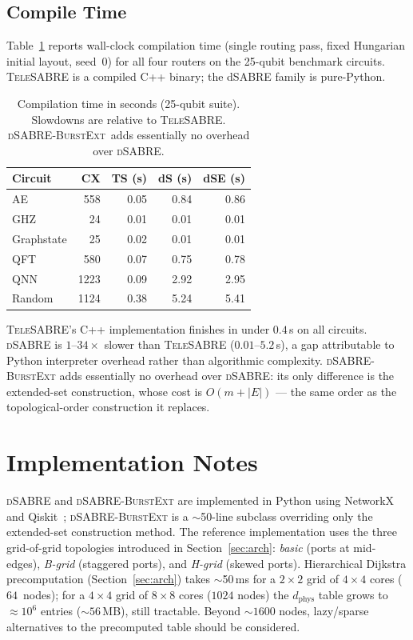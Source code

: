 \documentclass[conference]{IEEEtran}
\newcommand{\dSABRE}{\textsc{dSABRE}}
\newcommand{\BurstExt}{\textsc{dSABRE-BurstExt}}
\newcommand{\TeleSABRE}{\textsc{TeleSABRE}}
\newcommand{\dphys}{d_{\mathrm{phys}}}
\begin{document}
\subsection{Compile Time}
\label{sec:timing}

Table~\ref{tab:timing} reports wall-clock compilation time (single routing
pass, fixed Hungarian initial layout, seed~0) for all four routers on the
25-qubit benchmark circuits.
\TeleSABRE{} is a compiled C++ binary; the dSABRE family is pure-Python.

\begin{table}[t]
\centering
\caption{Compilation time in seconds (25-qubit suite).
  Slowdowns are relative to \TeleSABRE{}.
  \BurstExt\ adds essentially no overhead over \dSABRE.}
\label{tab:timing}
\setlength{\tabcolsep}{4pt}
\begin{tabular}{@{}lrrrr@{}}
\toprule
Circuit & CX & TS (s) & dS (s) & dSE (s) \\
\midrule
AE         &  558 & 0.05 &  0.84 &  0.86 \\
GHZ        &   24 & 0.01 &  0.01 &  0.01 \\
Graphstate &   25 & 0.02 &  0.01 &  0.01 \\
QFT        &  580 & 0.07 &  0.75 &  0.78 \\
QNN        & 1223 & 0.09 &  2.92 &  2.95 \\
Random     & 1124 & 0.38 &  5.24 &  5.41 \\
\bottomrule
\end{tabular}
\end{table}

\TeleSABRE{}'s C++ implementation finishes in under $0.4$\,s on all circuits.
\dSABRE{} is $1$--$34\times$ slower than \TeleSABRE{} ($0.01$--$5.2$\,s), a
gap attributable to Python interpreter overhead rather than algorithmic
complexity.
\BurstExt{} adds essentially no overhead over \dSABRE{}: its only difference
is the extended-set construction, whose cost is $O(m+|E|)$ --- the same order
as the topological-order construction it replaces.

\section{Implementation Notes}
\label{sec:impl}

\dSABRE{} and \BurstExt{} are implemented in Python using
NetworkX~\cite{hagberg2008exploring} and Qiskit~\cite{qiskit2024};
\BurstExt{} is a $\sim$50-line subclass overriding only the extended-set
construction method.
The reference implementation uses the three grid-of-grid topologies
introduced in Section~\ref{sec:arch}: \emph{basic} (ports at mid-edges),
\emph{B-grid} (staggered ports), and \emph{H-grid} (skewed ports).
Hierarchical Dijkstra precomputation (Section~\ref{sec:arch}) takes
$\sim$50\,ms for a $2\!\times\!2$ grid of $4\!\times\!4$ cores
($64$~nodes); for a $4\!\times\!4$ grid of $8\!\times\!8$ cores
($1024$ nodes) the $\dphys$ table grows to ${\approx}10^6$ entries
(${\sim}56$\,MB), still tractable.
Beyond ${\sim}1600$ nodes, lazy/sparse alternatives to the precomputed
table should be considered.
\end{document}
